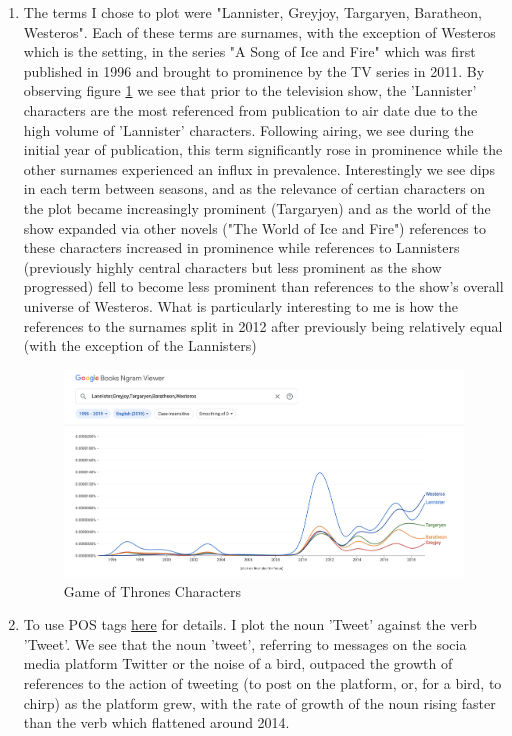 \documentclass{article}
\begin{document}
\begin{enumerate}
\item The terms I chose to plot were "Lannister, Greyjoy, Targaryen, Baratheon, Westeros". Each of these terms are surnames, with the exception of Westeros which is the setting,  in the series "A Song of Ice and Fire" which was first published in 1996 and brought to prominence by the TV series in 2011. By observing figure \ref{GOT} we see that prior to the television show, the 'Lannister' characters are the most referenced from publication to air date due to the high volume of 'Lannister' characters. Following airing, we see during the initial year of publication, this term significantly rose in prominence while the other surnames experienced an influx in prevalence. Interestingly we see dips in each term between seasons, and as the relevance of certian characters on the plot became increasingly prominent (Targaryen) and as the world of the show expanded via other novels ("The World of Ice and Fire") references to these characters increased in prominence while references to Lannisters (previously highly central characters but less prominent as the show progressed) fell to become less prominent than references to the show's overall universe of Westeros. What is particularly interesting to me is how the references to the surnames split in 2012 after previously being relatively equal (with the exception of the Lannisters)
\begin{figure}[h!]
	\centering
	\includegraphics[width=0.6\linewidth]{got.png}
	\caption{Game of Thrones Characters}\label{GOT}
\end{figure}
\item To use POS tags \href{https://books.google.com/ngrams/info}{here} for details. I plot the noun 'Tweet' against the verb 'Tweet'. We see that the noun 'tweet', referring to messages on the socia media platform Twitter or the noise of a bird, outpaced the growth of references to the action of tweeting (to post on the platform, or, for a bird, to chirp) as the platform grew, with the rate of growth of the noun rising faster than the verb which flattened around 2014.
\begin{figure}[h!]

\end{figure}
\end{enumerate}
\end{document}
